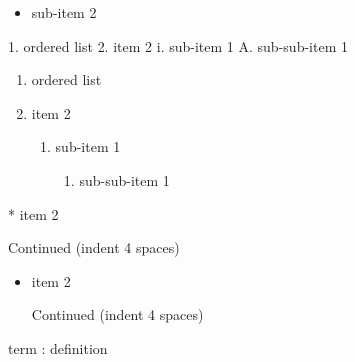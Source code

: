 \documentclass[
  letterpaper,
  DIV=11,
  numbers=noendperiod,
  oneside]{scrreprt}
\newenvironment{Shaded}{\begin{snugshade}}{\end{snugshade}}
\newcommand{\NormalTok}[1]{\textcolor[rgb]{0.00,0.23,0.31}{#1}}
\newcommand{\SpecialStringTok}[1]{\textcolor[rgb]{0.13,0.47,0.30}{#1}}
\providecommand{\tightlist}{%
  \setlength{\itemsep}{0pt}\setlength{\parskip}{0pt}}
\begin{document}
\begin{tcolorbox}
\begin{itemize}
\begin{itemize}
    \begin{itemize}
    \tightlist
    \item
      sub-sub-item 1
    \end{itemize}
  \item
    sub-item 2
  \end{itemize}
\end{itemize}

\begin{Shaded}
\begin{Highlighting}[]
\SpecialStringTok{1. }\NormalTok{ordered list}
\SpecialStringTok{2. }\NormalTok{item 2}
\NormalTok{   i. sub{-}item 1}
\NormalTok{      A.  sub{-}sub{-}item 1}
\end{Highlighting}
\end{Shaded}

\begin{enumerate}
\def\labelenumi{\arabic{enumi}.}
\tightlist
\item
  ordered list
\item
  item 2

  \begin{enumerate}
  \def\labelenumii{\roman{enumii}.}
  \tightlist
  \item
    sub-item 1

    \begin{enumerate}
    \def\labelenumiii{\Alph{enumiii}.}
    \tightlist
    \item
      sub-sub-item 1
    \end{enumerate}
  \end{enumerate}
\end{enumerate}

\begin{Shaded}
\begin{Highlighting}[]
\SpecialStringTok{*   }\NormalTok{item 2}
    
\NormalTok{    Continued (indent 4 spaces)}
\end{Highlighting}
\end{Shaded}

\begin{itemize}
\item
  item 2

  Continued (indent 4 spaces)
\end{itemize}

\begin{Shaded}
\begin{Highlighting}[]
\NormalTok{term}
\NormalTok{: definition}
\end{Highlighting}
\end{Shaded}


\end{tcolorbox}
\end{document}

